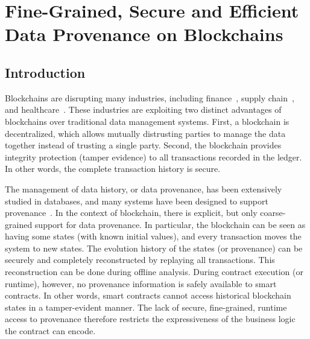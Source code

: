 \chapter{Fine-Grained, Secure and Efficient Data Provenance on Blockchains}
\label{ch:prov}

\section{Introduction}
\label{prov:sec:intro}
Blockchains are disrupting many industries, including
finance~\cite{tapscott2017blockchain,nguyen2016blockchain}, supply
chain~\cite{korpela2017digital,tian2016agri}, and healthcare~\cite{medilot}. These industries are exploiting
two distinct advantages of blockchains over traditional data management systems. First, a blockchain is
decentralized, which allows mutually distrusting parties to manage the data together instead of trusting a
single party.  Second, the blockchain provides integrity protection (tamper evidence) to all transactions
recorded in the ledger. In other words, the complete transaction history is secure.  

The management of data history, or data provenance, has been extensively studied in databases, and  many
systems have been designed to support
provenance~\cite{cheney2009provenance,chiticariu2005dbnotes,buneman2006provenance,park2011ramp,akoush2013hadoopprov,wang2015big}.
In the context of blockchain, there is explicit, but only coarse-grained support for data provenance. In
particular, the blockchain can be seen as having some states (with known initial values), and every
transaction moves the system to new states.  The evolution history of the states (or provenance) can be
securely and completely reconstructed by replaying all transactions. This reconstruction can be done 
during offline analysis. During contract execution (or runtime), however, no provenance information is
safely available to smart contracts. In other words, smart contracts cannot access historical blockchain
states in a tamper-evident manner. The lack of secure, fine-grained, runtime access to provenance therefore restricts the expressiveness of the business logic the contract can encode.

